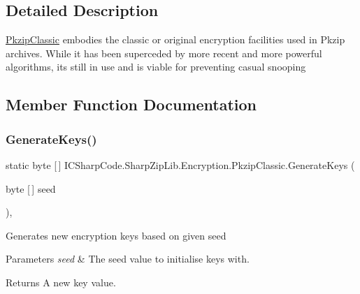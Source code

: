 \subsection{Detailed Description}
\hyperlink{class_i_c_sharp_code_1_1_sharp_zip_lib_1_1_encryption_1_1_pkzip_classic}{Pkzip\+Classic} embodies the classic or original encryption facilities used in Pkzip archives. While it has been superceded by more recent and more powerful algorithms, its still in use and is viable for preventing casual snooping 



\subsection{Member Function Documentation}
\mbox{\label{class_i_c_sharp_code_1_1_sharp_zip_lib_1_1_encryption_1_1_pkzip_classic_ab155ffc8aff5a20b8d536f15de025993}} 
\subsubsection{\texorpdfstring{Generate\+Keys()}{GenerateKeys()}\hspace{0.1cm}{\footnotesize\ttfamily [1/2]}}
{\footnotesize\ttfamily static byte \mbox{[}$\,$\mbox{]} I\+C\+Sharp\+Code.\+Sharp\+Zip\+Lib.\+Encryption.\+Pkzip\+Classic.\+Generate\+Keys (\begin{DoxyParamCaption}\item[{byte \mbox{[}$\,$\mbox{]}}]{seed }\end{DoxyParamCaption})\hspace{0.3cm}{\ttfamily [inline]}, {\ttfamily [static]}}



Generates new encryption keys based on given seed 


\begin{DoxyParams}{Parameters}
{\em seed} & The seed value to initialise keys with.\\
\hline
\end{DoxyParams}
\begin{DoxyReturn}{Returns}
A new key value.
\end{DoxyReturn}
\mbox{\label{class_i_c_sharp_code_1_1_sharp_zip_lib_1_1_encryption_1_1_pkzip_classic_ab155ffc8aff5a20b8d536f15de025993}} 
